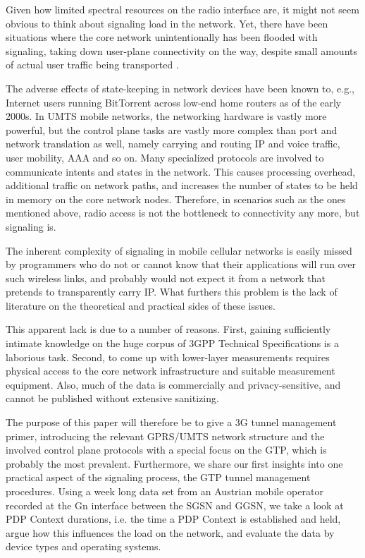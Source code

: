 Given how limited spectral resources on the radio interface are, it might not seem obvious to think about signaling load in the network. Yet, there have been situations where the core network unintentionally has been flooded with signaling, taking down user-plane connectivity on the way, despite small amounts of actual user traffic being transported \cite{lt2012docostorm, it2011birdandroid}. 

The adverse effects of state-keeping in network devices have been known to, e.g.,  Internet users running BitTorrent across low-end home routers as of the early 2000s. In \ac{UMTS} mobile networks, the networking hardware is vastly more powerful, but the control plane tasks are vastly more complex than port and network translation as well, namely carrying and routing IP and voice traffic, user mobility, \ac{AAA} and so on. Many specialized protocols are involved to communicate intents and states in the network. This causes processing overhead, additional traffic on network paths, and increases the number of states to be held in memory on the core network nodes. Therefore, in scenarios such as the ones mentioned above, radio access is not the bottleneck to connectivity any more, but signaling is.

The inherent complexity of signaling in mobile cellular networks is easily missed by programmers who do not or cannot know that their applications will run over such wireless links, and probably would not expect it from a network that pretends to transparently carry IP. What furthers this problem is the lack of literature on the theoretical and practical sides of these issues.

This apparent lack is due to a number of reasons. First, gaining sufficiently intimate knowledge on the huge corpus of \ac{3GPP} Technical Specifications %
is a laborious task. Second, to come up with lower-layer measurements requires physical access to the core network infrastructure and suitable measurement equipment. Also, much of the data is commercially and privacy-sensitive, and cannot be published without extensive sanitizing.

The purpose of this paper will therefore be to give a 3G tunnel management primer, introducing the relevant \acs{GPRS}/\acs{UMTS} network structure and the involved control plane protocols with a special focus on the \ac{GTP}, which is probably the most prevalent. %
Furthermore, we share our first insights into one practical aspect of the signaling process, the \ac{GTP} tunnel management procedures. Using a week long data set from an Austrian mobile operator recorded at the Gn interface between the \ac{SGSN} and \ac{GGSN}, %
we take a look at \ac{PDP} Context durations, i.e. the time a \ac{PDP} Context is established and held, argue how this influences the load on the network, and evaluate the data by device types and operating systems.


